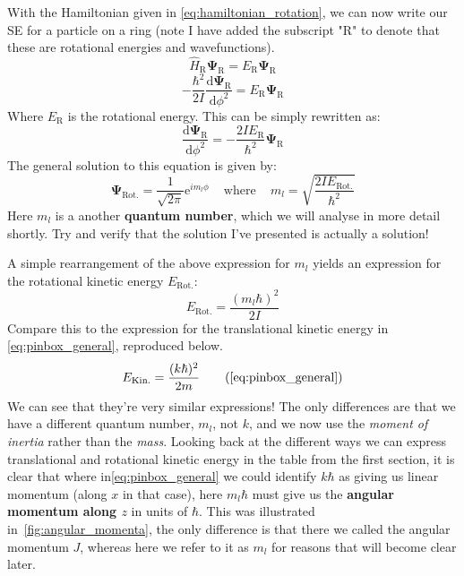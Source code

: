 \documentclass{memoir}[11pt,oneside,a4paper,openany]
\newcommand{\wf}{\ensuremath{\bm{\Psi}}\xspace}
\newcommand{\dd}{\ensuremath{\mathrm{d}}}
\begin{document}
With the Hamiltonian given in \autoref{eq:hamiltonian_rotation}, we can now write our SE for a particle on a ring (note I have added the subscript "R" to denote that these are rotational energies and wavefunctions).
\begin{equation}
	\hat{H}_{\text{R}} \wf_{\text{R}} = E_{\text{R}} \wf_{\text{R}}
\end{equation}
\begin{equation}
	-\frac{\hbar^2}{2I}\frac{\dd \wf_{\text{R}}}{\dd\phi^2} = E_{\text{R}} \wf_{\text{R}}
\end{equation}
Where $E_{\text{R}}$ is the rotational energy. This can be simply rewritten as: 
\begin{equation}
	\frac{\dd \wf_{\text{R}}}{\dd\phi^2} = -\frac{2IE_{\text{R}}}{\hbar^2}\wf_{\text{R}}
\end{equation}
The general solution to this equation is given by:
\begin{equation}\label{eq:rotational_general_solution}
	\wf_{\text{Rot.}} = \frac{1}{\sqrt{2\pi}}\mathrm{e}^{im_l\phi}\,\quad\text{where}\quad\,m_l=\sqrt{\frac{2IE_{\text{Rot.}}}{\hbar^2}}
\end{equation}
Here $m_l$ is a another \textbf{quantum number}, which we will analyse in more detail shortly. Try and verify that the solution I've presented is actually a solution!

A simple rearrangement of the above expression for $m_l$ yields an expression for the rotational kinetic energy $E_{\text{Rot.}}$:
\begin{equation}
	E_{\text{Rot.}} = \frac{(m_l \hbar)^2}{2I}
\end{equation}
Compare this to the expression for the translational kinetic energy in \autoref{eq:pinbox_general}, reproduced below.
\begin{equation*}
	E_{\text{Kin.}} = \frac{(k\hbar)^2}{2m} \tag{\ref{eq:pinbox_general}}
\end{equation*}
We can see that they're very similar expressions! The only differences are that we have a different quantum number, $m_l$, not $k$, and we now use the \emph{moment of inertia} rather than the \emph{mass}. Looking back at the different ways we can express translational and rotational kinetic energy in the table from the first section, it is clear that where in\autoref{eq:pinbox_general} we could identify $k\hbar$ as giving us linear momentum (along $x$ in that case), here $m_l\hbar$ must give us the \textbf{angular momentum along $z$} in units of $\hbar$. This was illustrated in~\autoref{fig:angular_momenta}, the only difference is that there we called the angular momentum $J$, whereas here we refer to it as $m_l$ for reasons that will become clear later.   
\end{document}
